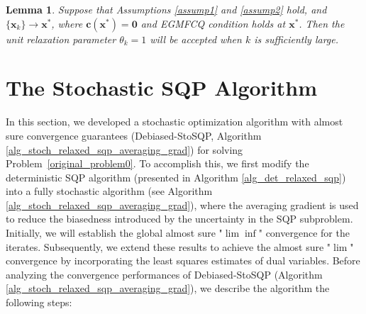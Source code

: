 \documentclass[aos]{imsart}
\numberwithin{equation}{section}
\theoremstyle{plain}
\newtheorem{lemma}{Lemma}
\begin{document}
\begin{lemma}
\label{theorem_local_relaxation_parameter}
    Suppose that Assumptions \ref{assump1} and \ref{assump2} hold, and $\{\bm{x}_k\} \to \bm{x}^{*}$, where $\bm{c}(\bm{x}^{*}) = \bm{0}$ and EGMFCQ condition holds at $\bm{x}^{*}$. Then the unit relaxation parameter $\theta_k = 1$ will be accepted when $k$ is sufficiently large.
\end{lemma}



\section{The Stochastic SQP Algorithm}
\label{sec:relaxed_stochSQP}

In this section, we developed a stochastic optimization algorithm with almost sure convergence guarantees (Debiased-StoSQP, Algorithm \ref{alg_stoch_relaxed_sqp_averaging_grad}) for solving Problem~\eqref{original_problem0}.  
To accomplish this,
we first modify the deterministic SQP algorithm (presented in Algorithm \ref{alg_det_relaxed_sqp}) into a fully stochastic algorithm (see Algorithm \ref{alg_stoch_relaxed_sqp_averaging_grad}), where the averaging gradient is used to reduce the biasedness introduced by the uncertainty in the SQP subproblem. 
Initially, we will establish the global almost sure "$\lim \inf$" convergence for the iterates. 
Subsequently, we extend these results to achieve the almost sure "$\lim$" convergence by incorporating the least squares estimates of dual variables. Before analyzing the convergence performances of Debiased-StoSQP (Algorithm \ref{alg_stoch_relaxed_sqp_averaging_grad}), we describe the algorithm the following steps:
\end{document}
